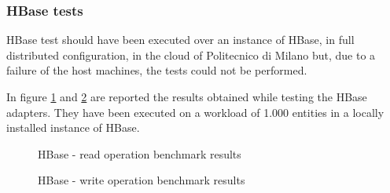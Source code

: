 \subsubsection{HBase tests}
HBase test should have been executed over an instance of HBase, in full distributed configuration, in the cloud of Politecnico di Milano but, due to a failure of the host machines, the tests could not be performed.

\noindent In figure \ref{fig:hbase-test-read} and \ref{fig:hbase-test-write} are reported the results obtained while testing the HBase adapters. They have been executed on a workload of 1.000 entities in a locally installed instance of HBase.

\begin{figure}[tbh]
  \centering
  \caption{HBase - read operation benchmark results}
  \label{fig:hbase-test-read}
\end{figure} 

\begin{figure}[tbh]
  \centering
  \caption{HBase - write operation benchmark results}
  \label{fig:hbase-test-write}
\end{figure} 

